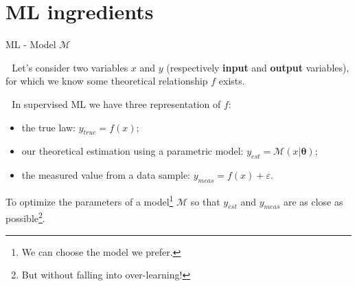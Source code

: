 \documentclass[8pt, xcolor={svgnames}, hyperref={colorlinks,linkcolor=black, citecolor=amethyst, urlcolor=amethyst}]{beamer}
\begin{document}
\section{ML ingredients}


\begin{frame}{ML - Model $\mathcal{M}$}
\large

\faArrowCircleRight\,\, Let's consider two variables $x$ and $y$ (respectively 
\textbf{input} and \textbf{output} variables), for which we know some theoretical 
relationship $f$ exists.

\pause

\faArrowCircleRight\,\, In supervised ML we have three representation of $f$:

\pause

\begin{itemize}[noitemsep]
    \item[\tiny\faCircle] the true law: $y_{true}=f(x)$;

    \pause
    \item[\tiny\faCircle] our theoretical estimation using a parametric model: 
    $ y_{est} = \mathcal{M}(x | \bm{\theta})$;

    \pause
    \item[\tiny\faCircle] the measured value from a data sample: $y_{meas} = f(x) + \varepsilon$.
\end{itemize}
\pause

\vspace{0.5cm}
\begin{tcolorbox}[colback=amethyst!20, title=Supervised ML goal]
To optimize the parameters of a model\footnote{We can choose the model we prefer.}  
$\mathcal{M}$ so that $y_{est}$ and $y_{meas}$ are as close as possible\footnote{But without falling into over-learning!}.
\end{tcolorbox}

\end{frame}
\end{document}
